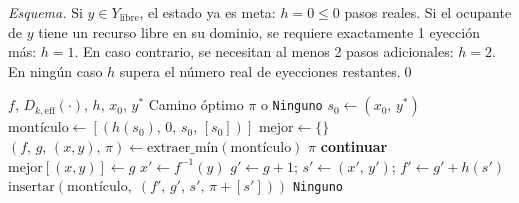 \documentclass[12pt, a4paper]{article}
\theoremstyle{definition}
\theoremstyle{plain}
\theoremstyle{remark}
\newcommand{\domk}[2]{D_{#1}\!\left(#2\right)}
\newcommand{\inv}[1]{f^{-1}\!\left(#1\right)}
\begin{document}
\begin{proof}[Esquema]
  Si $y \in Y_{\text{libre}}$, el estado ya es meta: $h = 0 \leq 0$ pasos
  reales.  Si el ocupante de $y$ tiene un recurso libre en su dominio,
  se requiere exactamente 1 eyección más: $h = 1$.  En caso contrario,
  se necesitan al menos 2 pasos adicionales: $h = 2$.
  En ningún caso $h$ supera el número real de eyecciones restantes.\qed
\end{proof}

\begin{algorithm}[H]
\caption{A* para Ejection Chain Mínima}
\label{alg:astar}
\begin{algorithmic}[1]
\Require $f$, $\domk{k,\text{eff}}{\cdot}$, $h$, $x_0$, $y^*$
\Ensure Camino óptimo $\pi$ o \texttt{Ninguno}
\State $s_0 \leftarrow (x_0,\, y^*)$
\State $\text{montículo} \leftarrow [(h(s_0),\, 0,\, s_0,\, [s_0])]$
\State $\text{mejor} \leftarrow \{\}$
  \State $(f,\, g,\, (x, y),\, \pi) \leftarrow \text{extraer\_mín}(\text{montículo})$
    \Return $\pi$
  \EndIf
    \State \textbf{continuar}
  \EndIf
  \State $\text{mejor}[(x,y)] \leftarrow g$
  \State $x' \leftarrow \inv{y}$
  \ForEach{$y' \in \domk{k,\text{eff}}{x'}$}
    \State $g' \leftarrow g + 1$;
           \quad $s' \leftarrow (x',\, y')$;
           \quad $f' \leftarrow g' + h(s')$
    \State $\text{insertar}(\text{montículo},\; (f',\, g',\, s',\, \pi+[s']))$
  \EndFor
\EndWhile
\Return \texttt{Ninguno}
\end{algorithmic}
\end{algorithm}
\end{document}
